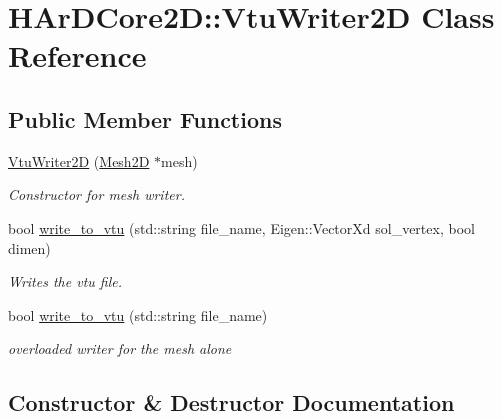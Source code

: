 \hypertarget{classHArDCore2D_1_1VtuWriter2D}{}\section{H\+Ar\+D\+Core2D\+:\+:Vtu\+Writer2D Class Reference}
\label{classHArDCore2D_1_1VtuWriter2D}
\subsection*{Public Member Functions}
\begin{DoxyCompactItemize}
\item 
\hyperlink{classHArDCore2D_1_1VtuWriter2D_a30e274ce0dc037bff8720149b4c012f3}{Vtu\+Writer2D} (\hyperlink{classHArDCore2D_1_1Mesh2D}{Mesh2D} $\ast$mesh)
\begin{DoxyCompactList}\small\item\em Constructor for mesh writer. \end{DoxyCompactList}\item 
bool \hyperlink{classHArDCore2D_1_1VtuWriter2D_a3004c510461c2978278e781c8edec951}{write\+\_\+to\+\_\+vtu} (std\+::string file\+\_\+name, Eigen\+::\+Vector\+Xd sol\+\_\+vertex, bool dimen)
\begin{DoxyCompactList}\small\item\em Writes the vtu file. \end{DoxyCompactList}\item 
\mbox{\label{classHArDCore2D_1_1VtuWriter2D_a5c3d3a2fc48b70a5ab1d3a4af207dc7e}} 
bool \hyperlink{classHArDCore2D_1_1VtuWriter2D_a5c3d3a2fc48b70a5ab1d3a4af207dc7e}{write\+\_\+to\+\_\+vtu} (std\+::string file\+\_\+name)
\begin{DoxyCompactList}\small\item\em overloaded writer for the mesh alone \end{DoxyCompactList}\end{DoxyCompactItemize}


\subsection{Constructor \& Destructor Documentation}
\mbox{\label{classHArDCore2D_1_1VtuWriter2D_a30e274ce0dc037bff8720149b4c012f3}} 
